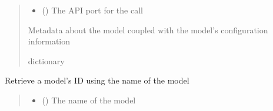 \documentclass[letterpaper,10pt,english]{sphinxmanual}
\begin{document}
\begin{fulllineitems}
\begin{fulllineitems}
\begin{quote}
\begin{description}
\begin{itemize}
\item {} 
\sphinxAtStartPar
{} (\sphinxstyleliteralemphasis{\sphinxupquote{ (}}\sphinxstyleliteralemphasis{\sphinxupquote{)}}) \textendash{} The API port for the call

\end{itemize}

\sphinxAtStartPar
{} \textendash{} Metadata about the model coupled with the model’s configuration information

\sphinxAtStartPar
dictionary

\end{description}\end{quote}

\end{fulllineitems}


\begin{fulllineitems}
\label{\detokenize{aisquared.platform:aisquared.platform.AISquaredPlatformClient.AISquaredPlatformClient.get_model_id_by_name}}
\pysigstartsignatures
{}
\pysigstopsignatures
\sphinxAtStartPar
Retrieve a model’s ID using the name of the model

\begin{sphinxVerbatim}[commandchars=\\\{\}]
 
  
\end{sphinxVerbatim}
\begin{quote}\begin{description}
\begin{itemize}
\item {} 
\sphinxAtStartPar
{} () \textendash{} The name of the model


\end{itemize}
\end{description}
\end{quote}
\end{fulllineitems}
\end{fulllineitems}
\end{document}

